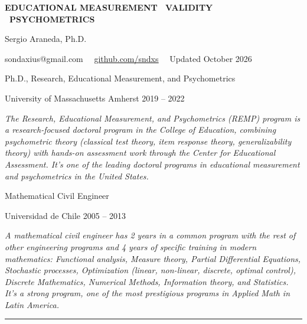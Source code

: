 \documentclass[10.5pt]{article}
\newcommand{\link}[2]{\href{#1}{\color{cvaccent}\uline{#2}}}
\begin{document}

{\color{cvaccent}\fontsize{8.3}{10}\selectfont\bfseries \MakeUppercase{Educational Measurement \textbullet\ Validity \textbullet\ Psychometrics}}\par\vspace{7pt}
{\playfair\fontsize{34}{38}\selectfont\color{cvink} Sergio Araneda, Ph.D.}\par\vspace{9pt}
{\fontsize{10.5}{13}\selectfont\color{cvmuted} sondaxius@gmail.com
\ \textbar\ \link{https://github.com/sndxs}{github.com/sndxs}
\ \textbar\ Updated October 2026}
\par\vspace{18pt}

Ph.D., Research, Educational Measurement, and Psychometrics\par
{\color{cvmuted}University of Massachusetts Amherst 2019 -- 2022}\par\vspace{8pt}
{\itshape\color{cvmuted} The Research, Educational Measurement, and Psychometrics (REMP) program is a
research-focused doctoral program in the College of Education, combining psychometric theory
(classical test theory, item response theory, generalizability theory) with hands-on
assessment work through the Center for Educational Assessment. It's one of the leading
doctoral programs in educational measurement and psychometrics in the United States.}\par\vspace{14pt}
Mathematical Civil Engineer\par
{\color{cvmuted}Universidad de Chile 2005 -- 2013}\par\vspace{8pt}
{\itshape\color{cvmuted} A mathematical civil engineer has 2 years in a common program with the rest of other
engineering programs and 4 years of specific training in modern mathematics:
Functional analysis, Measure theory, Partial Differential Equations, Stochastic
processes, Optimization (linear, non-linear, discrete, optimal control), Discrete
Mathematics, Numerical Methods, Information theory, and Statistics. It's a strong
program, one of the most prestigious programs in Applied Math in Latin America.}
\par\vspace{16pt}
{\color{cvhairline}\rule{\linewidth}{1pt}}
\end{document}
